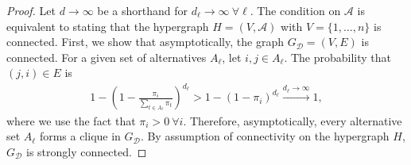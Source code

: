 \begin{proof}
Let $d \to \infty$ be a shorthand for $d_\ell \to \infty \ \forall \ell$.
The condition on $\mathcal{A}$ is equivalent to stating that the hypergraph $H = (V, \mathcal{A})$ with $V = \{1, \ldots, n\}$ is connected.
First, we show that asymptotically, the graph $G_\mathcal{D} = (V, E)$ is connected.
For a given set of alternatives $A_\ell$, let $i, j \in A_\ell$.
The probability that $(j, i) \in E$ is
\begin{align}
1 - \left(1 - \frac{\pi_i}{\sum_{t \in A_\ell} \pi_t} \right)^{d_\ell}
> 1 - (1 - \pi_i)^{d_\ell}
\xrightarrow{d_\ell \to \infty} 1,
\end{align}
where we use the fact that $\pi_i > 0 \ \forall i$.
Therefore, asymptotically, every alternative set $A_\ell$ forms a clique in $G_\mathcal{D}$.
By assumption of connectivity on the hypergraph $H$, $G_{\mathcal{D}}$ is strongly connected.


\end{proof}
